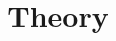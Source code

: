 \documentclass{ximera}
\title{Theory}
\begin{document}
\begin{abstract}
\end{abstract}
\maketitle
\end{document}
